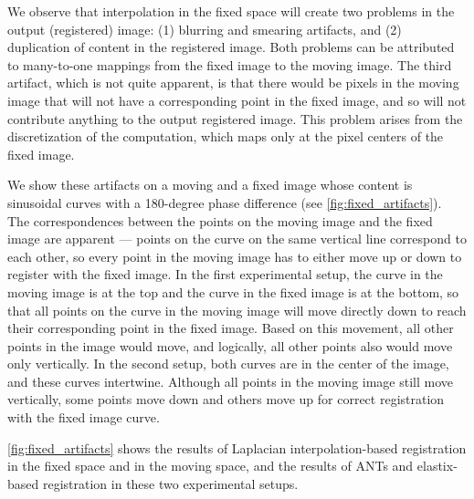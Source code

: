 We observe that interpolation in the fixed space will create two problems in the output (registered) image: (1) blurring and smearing artifacts, and (2) duplication of content in the registered image. Both problems can be attributed to many-to-one mappings from the fixed image to the moving image. The third artifact, which is not quite apparent, is that there would be pixels in the moving image that will not have a corresponding point in the fixed image, and so will not contribute anything to the output registered image. This problem arises from the discretization of the computation, which maps only at the pixel centers of the fixed image.

We show these artifacts on a moving and a fixed image whose content is sinusoidal curves with a 180-degree phase difference (see \autoref{fig:fixed_artifacts}). The correspondences between the points on the moving image and the fixed image are apparent — points on the curve on the same vertical line correspond to each other, so every point in the moving image has to either move up or down to register with the fixed image. In the first experimental setup, the curve in the moving image is at the top and the curve in the fixed image is at the bottom, so that all points on the curve in the moving image will move directly down to reach their corresponding point in the fixed image. Based on this movement, all other points in the image would move, and logically, all other points also would move only vertically. In the second setup, both curves are in the center of the image, and these curves intertwine. Although all points in the moving image still move vertically, some points move down and others move up for correct registration with the fixed image curve.

\autoref{fig:fixed_artifacts} shows the results of Laplacian interpolation-based registration in the fixed space and in the moving space, and the results of ANTs and elastix-based registration in these two experimental setups. 

